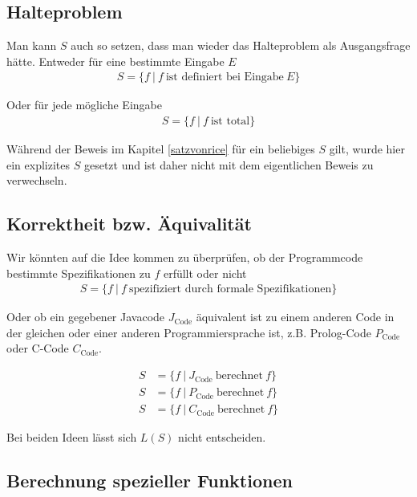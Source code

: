 \documentclass[journal]{IEEEtran}
\begin{document}
\subsection{Halteproblem}

Man kann $S$ auch so setzen, dass man wieder das Halteproblem als Ausgangsfrage hätte. Entweder für eine bestimmte Eingabe $E$
\begin{align*}
S = \{ f \ \vert \ f \ \text{ist definiert bei Eingabe} \ E \}
\end{align*}

Oder für jede mögliche Eingabe
\begin{align*}
S = \{ f \ \vert \ f \ \text{ist total} \}
\end{align*}

Während der Beweis im Kapitel \ref{satzvonrice} für ein beliebiges $S$ gilt, wurde hier ein explizites $S$ gesetzt und ist daher nicht mit dem eigentlichen Beweis zu verwechseln.

\subsection{Korrektheit bzw. Äquivalität}

Wir könnten auf die Idee kommen zu überprüfen, ob der Programmcode bestimmte Spezifikationen zu $f$ erfüllt oder nicht
\begin{align*}
S = \{f \ \vert \ f \ \text{spezifiziert durch formale Spezifikationen} \}
\end{align*}

Oder ob ein gegebener Javacode $J_\mathrm{Code}$ äquivalent ist zu einem anderen Code in der gleichen oder einer anderen Programmiersprache ist, z.B. Prolog-Code $P_\mathrm{Code}$ oder C-Code $C_\mathrm{Code}$.

\begin{align*}
S &= \{f \ \vert \ J_\mathrm{Code} \ \text{berechnet} \ f \} \\
S &= \{f \ \vert \ P_\mathrm{Code} \ \text{berechnet} \ f \} \\
S &= \{f \ \vert \ C_\mathrm{Code} \ \text{berechnet} \ f \}
\end{align*}

Bei beiden Ideen lässt sich $L(S)$ nicht entscheiden.

\subsection{Berechnung spezieller Funktionen}
\end{document}
